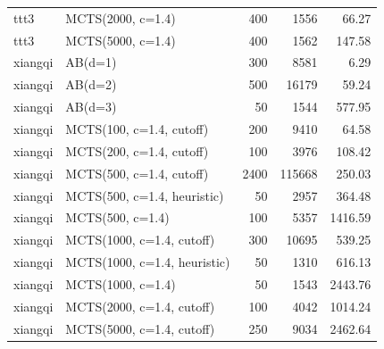 \begin{table}[!t]
\begin{tabular}{llrrr}
ttt3 & MCTS(2000, c=1.4) & 400 & 1556 & 66.27 \\
ttt3 & MCTS(5000, c=1.4) & 400 & 1562 & 147.58 \\
xiangqi & AB(d=1) & 300 & 8581 & 6.29 \\
xiangqi & AB(d=2) & 500 & 16179 & 59.24 \\
xiangqi & AB(d=3) & 50 & 1544 & 577.95 \\
xiangqi & MCTS(100, c=1.4, cutoff) & 200 & 9410 & 64.58 \\
xiangqi & MCTS(200, c=1.4, cutoff) & 100 & 3976 & 108.42 \\
xiangqi & MCTS(500, c=1.4, cutoff) & 2400 & 115668 & 250.03 \\
xiangqi & MCTS(500, c=1.4, heuristic) & 50 & 2957 & 364.48 \\
xiangqi & MCTS(500, c=1.4) & 100 & 5357 & 1416.59 \\
xiangqi & MCTS(1000, c=1.4, cutoff) & 300 & 10695 & 539.25 \\
xiangqi & MCTS(1000, c=1.4, heuristic) & 50 & 1310 & 616.13 \\
xiangqi & MCTS(1000, c=1.4) & 50 & 1543 & 2443.76 \\
xiangqi & MCTS(2000, c=1.4, cutoff) & 100 & 4042 & 1014.24 \\
xiangqi & MCTS(5000, c=1.4, cutoff) & 250 & 9034 & 2462.64 \\
\bottomrule
\end{tabular}
\end{table}
